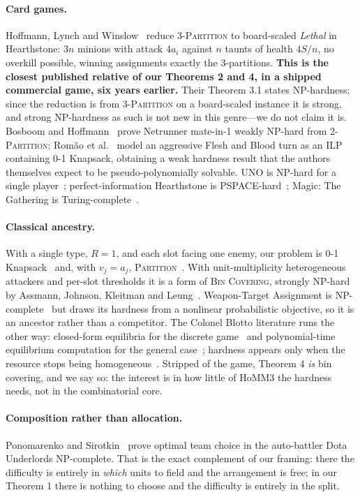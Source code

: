 \documentclass[11pt,a4paper]{article}
\theoremstyle{plain}
\theoremstyle{definition}
\theoremstyle{plain}
\theoremstyle{definition}
\theoremstyle{remark}
\newcommand{\PARTITION}{\textsc{Partition}}
\newcommand{\THREEPART}{\textsc{3-Partition}}
\begin{document}
\paragraph{Card games.} Hoffmann, Lynch and Winslow~\cite{HLW20} reduce \THREEPART{} to
board-scaled \emph{Lethal} in Hearthstone: $3n$ minions with attack $4a_i$ against $n$ taunts of
health $4S/n$, no overkill possible, winning assignments exactly the 3-partitions. \textbf{This
is the closest published relative of our Theorems 2 and 4, in a shipped commercial game, six
years earlier.} Their Theorem 3.1 states NP-hardness; since the reduction is from \THREEPART{}
on a board-scaled instance it is strong, and strong NP-hardness as such is not new in this
genre---we do not claim it is. Bosboom and Hoffmann~\cite{BH17} prove Netrunner mate-in-1 weakly NP-hard from
2-\textsc{Partition}; Rom\~ao et al.~\cite{RPU25} model an aggressive Flesh and Blood turn as an
ILP containing 0-1 Knapsack, obtaining a weak hardness result that the authors themselves
expect to be pseudo-polynomially solvable. UNO is NP-hard for a single player~\cite{DDHUUU14};
perfect-information Hearthstone is PSPACE-hard~\cite{Zha23}; Magic: The Gathering is
Turing-complete~\cite{CBH19}.

\paragraph{Classical ancestry.} With a single type, $R=1$, and each slot facing one enemy, our
problem is 0-1 Knapsack~\cite{Kar72} and, with $v_j=a_j$, \PARTITION~\cite[SP12]{GJ79}. With
unit-multiplicity heterogeneous attackers and per-slot thresholds it is a form of \textsc{Bin
Covering}, strongly NP-hard by Assmann, Johnson, Kleitman and Leung~\cite{AJKL84}.
Weapon-Target Assignment is NP-complete~\cite{LW86} but draws its hardness from a nonlinear
probabilistic objective, so it is an ancestor rather than a competitor. The Colonel Blotto
literature runs the other way: closed-form equilibria for the discrete game~\cite{Har08} and
polynomial-time equilibrium computation for the general case~\cite{ADHLMS19}; hardness appears
only when the resource stops being homogeneous~\cite{DSST21}.
Stripped of the game, Theorem 4 \emph{is} bin covering, and we say so: the interest is in how
little of HoMM3 the hardness needs, not in the combinatorial core.

\paragraph{Composition rather than allocation.} Ponomarenko and Sirotkin~\cite{PS20} prove
optimal team choice in the auto-battler Dota Underlords NP-complete. That is the exact complement
of our framing: there the difficulty is entirely in \emph{which} units to field and the
arrangement is free; in our Theorem 1 there is nothing to choose and the difficulty is entirely
in the split.
\end{document}
